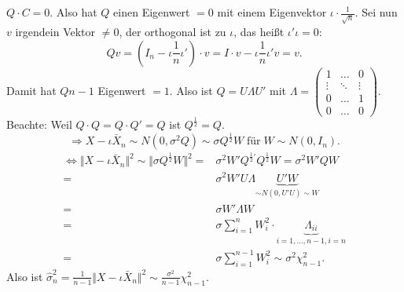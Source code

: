 \documentclass[10pt]{article}
\newcommand{\sni}{\sum_{i=1}^{n}} %
\newcommand{\halb}{\frac{1}{2}} %
\newenvironment{BSP}[1][]
{\begin{Beispiel}[frametitle=#1]}{\end{Beispiel}}
\begin{document}
\begin{BSP}[Beispiel 4.0.2 (Mittelwertschätzer)]
				$Q \cdot C = 0$. Also hat $Q$ einen Eigenwert $=0$ mit einem Eigenvektor $\iota \cdot \frac{1}{\sqrt{n}}$. Sei nun $v$ irgendein Vektor $\neq 0$, der orthogonal ist zu $\iota$, das heißt $\iota'\iota=0$:
				\begin{equation*}
					Qv = \left(I_n - \iota \frac{1}{n}\iota'\right) \cdot v = I \cdot v - \iota \frac{1}{n}\iota'v = v.
				\end{equation*}
				Damit hat $Q n-1$ Eigenwert $=1$. Also ist $Q = U \Lambda U'$ mit $\Lambda = \begin{pmatrix}
					1 & \ldots & 0\\
					\vdots & \ddots & \vdots \\
					0 & \ldots & 1\\
					0 & \ldots & 0
				\end{pmatrix}$. Beachte: Weil $Q \cdot Q = Q \cdot Q' = Q$ ist $Q^{\halb} = Q$.
				\begin{equation*}
					\Longrightarrow X - \iota \bar{X}_n \sim N(0, \sigma^2 Q) \sim \sigma Q^{\halb} W \; \text{für} \; W\sim N(0,I_n).
				\end{equation*}
				\begin{equation*}
					\begin{split}
						\Leftrightarrow \Vert X - \iota \bar{X}_n \Vert^2 \sim \Vert \sigma Q^{\halb}W\Vert^2 =& \sigma^2 W' Q^{\halb'} Q^{\halb}W = \sigma^2 W' Q W\\
						=& \sigma^2 W'U\Lambda \underbrace{U'W}_{\sim N(0,U'U) \sim W}\\
						=& \sigma W' \Lambda W\\
						=& \sigma \sni W_i^2 \cdot \underbrace{\Lambda_{ii}}_{i = 1, \ldots, n-1, i=n}\\
						=& \sigma \sum_{i =1}^{n-1} W_i^2 \sim \sigma^2 \chi^2_{n-1}.
					\end{split}
				\end{equation*}
				Also ist $\hat{\sigma}^2_n = \frac{1}{n-1} \Vert X - \iota \bar{X}_n\Vert^2 \sim \frac{\sigma^2}{n-1} \chi^2_{n-1}$.
			\end{BSP}
			
\end{document}
